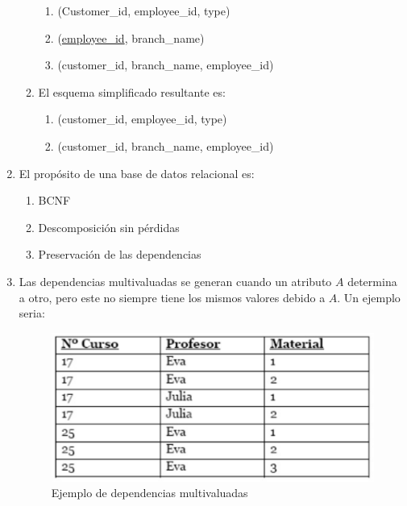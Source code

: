 \documentclass[twoside]{article}
\begin{document}
\begin{enumerate}
\begin{enumerate}
\begin{enumerate}
                              \item (Customer\_id, employee\_id, type)
                              \item (\underline{employee\_id}, branch\_name)
                              \item (customer\_id, branch\_name, employee\_id)
                        \end{enumerate}
                  \item El esquema simplificado resultante es:
                        \begin{enumerate}
                              \item (customer\_id, employee\_id, type)
                              \item (customer\_id, branch\_name, employee\_id)
                        \end{enumerate}
            \end{enumerate}
      \item El propósito de una base de datos relacional es:
            \begin{enumerate}
                  \item BCNF
                  \item Descomposición sin pérdidas
                  \item Preservación de las dependencias
            \end{enumerate}
      \item Las dependencias multivaluadas se generan cuando un atributo $A$ determina a otro, pero este no siempre tiene los mismos valores debido a $A$. Un ejemplo seria:
            \begin{figure}[htb]
                  \begin{center}
                        \includegraphics[scale=0.6]{multivalue.png}
                        \caption{Ejemplo de dependencias multivaluadas}
                  \end{center}
            \end{figure}

\end{enumerate}
\end{document}
